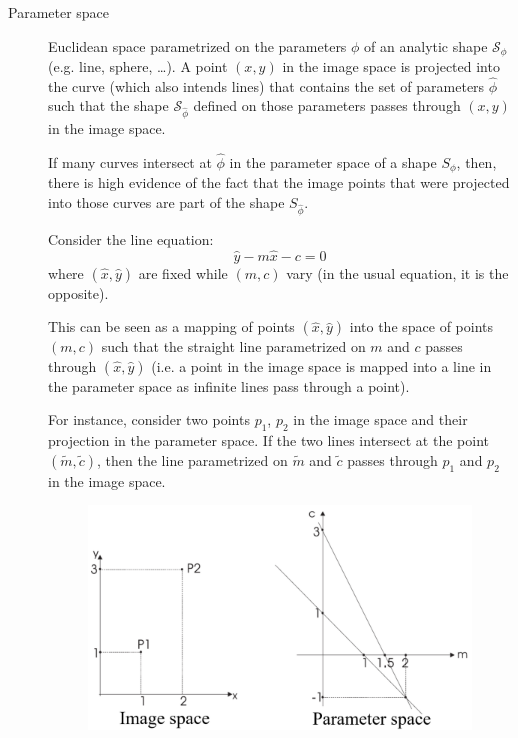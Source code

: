 \begin{description}
    \item[Parameter space] 
        Euclidean space parametrized on the parameters $\phi$ of an analytic shape $\mathcal{S}_\phi$ (e.g. line, sphere, \dots).
        A point $(x, y)$ in the image space is projected into the curve (which also intends lines) that contains the set of parameters $\hat{\phi}$
        such that the shape $\mathcal{S}_{\hat{\phi}}$ defined on those parameters passes through $(x, y)$ in the image space.

        \begin{remark}
            If many curves intersect at $\hat{\phi}$ in the parameter space of a shape $S_\phi$, then, there is high evidence of the fact that 
            the image points that were projected into those curves are part of the shape $S_{\hat{\phi}}$.
        \end{remark}

        \begin{example} 
            Consider the line equation:
            \[ \hat{y} - m\hat{x} - c = 0 \]
            where $(\hat{x}, \hat{y})$ are fixed while $(m, c)$ vary (in the usual equation, it is the opposite).

            This can be seen as a mapping of points $(\hat{x}, \hat{y})$ into the space
            of points $(m, c)$ such that the straight line parametrized on $m$ and $c$ passes through $(\hat{x}, \hat{y})$
            (i.e. a point in the image space is mapped into a line in the parameter space as infinite lines pass through a point).

            For instance, consider two points $p_1$, $p_2$ in the image space and
            their projection in the parameter space.
            If the two lines intersect at the point $(\tilde{m}, \tilde{c})$,
            then the line parametrized on $\tilde{m}$ and $\tilde{c}$ passes through $p_1$ and $p_2$ in the image space.
            
            \begin{figure}[H]
                \centering
                \includegraphics[width=0.4\linewidth]{./img/hough_line_parameter_space.png}
            \end{figure}


\end{example}
\end{description}
